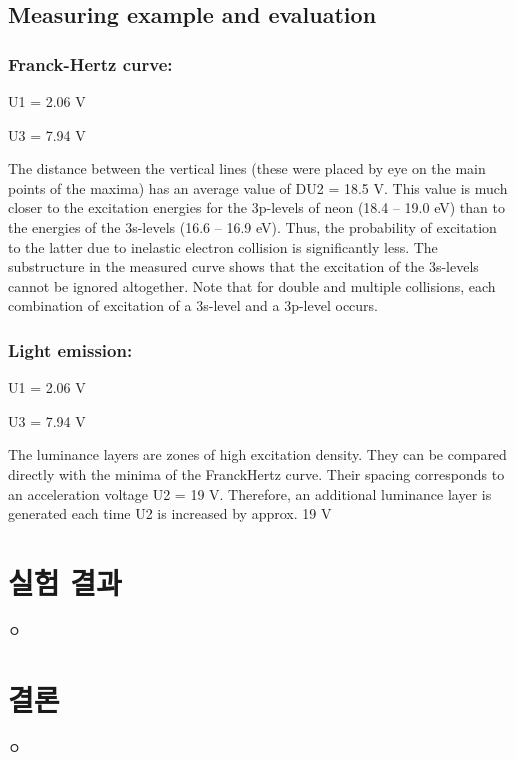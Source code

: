 \documentclass[a4paper, 10pt, nanum]{CSUniSchoolLabReport}
\begin{document}
\subsection{Measuring example and evaluation}

\subsubsection{Franck-Hertz curve:}
	U1 = 2.06 V

	U3 = 7.94 V 

	The distance between the vertical lines (these were placed by eye on the main points of the maxima) has an average value of DU2 = 18.5 V. This value is much closer to the excitation energies for the 3p-levels of neon (18.4 – 19.0 eV) than to the energies of the 3s-levels (16.6 – 16.9 eV). Thus, the probability of excitation to the latter due to inelastic electron collision is significantly less. The substructure in the measured curve shows that the excitation of the 3s-levels cannot be ignored altogether. Note that for double and multiple collisions, each combination of excitation of a 3s-level and a 3p-level occurs. 

\subsubsection{Light emission:}
	U1 = 2.06 V

	U3 = 7.94 V 

	The luminance layers are zones of high excitation density. They can be compared directly with the minima of the FranckHertz curve. Their spacing corresponds to an acceleration voltage U2 = 19 V. Therefore, an additional luminance layer is generated each time U2 is increased by approx. 19 V 



\section{실험 결과}

	ㅇ



\section{결론}

	ㅇ



\end{document}
